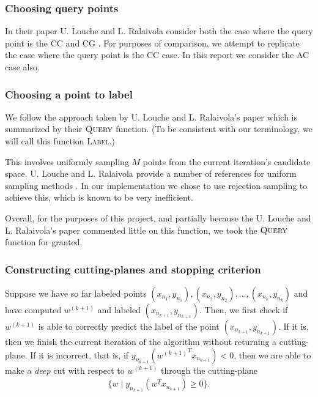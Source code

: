 \documentclass[11pt]{amsart}
\theoremstyle{definition}
\theoremstyle{remark}
\newcommand{\transpose}{T}
\begin{document}
            \subsubsection*{Choosing query points} In their paper U. Louche and L. Ralaivola consider both the case where the query point is the CC and  CG \cite[Section III.D]{LR15}. For purposes of comparison, we attempt to replicate the case where the query point is the CC case. In this report we consider the AC case also.

            \subsubsection*{Choosing a point to label }We follow the approach taken by U. Louche and L. Ralaivola's paper \cite[Section III.D]{LR15} which is summarized by their $\textsc{Query}$ function. (To be consistent with our terminology, we will call this function \textsc{Label}.)

            This involves uniformly sampling $M$ points from the current iteration's candidate space. U. Louche and L. Ralaivola provide a number of references for uniform sampling methods \cite[Section III.D]{LR15}. In our implementation we chose to use rejection sampling to achieve this, which is known to be very inefficient. 
        
            Overall, for the purposes of this project, and partially because the U. Louche and L. Ralaivola's paper \cite[Section III.D]{LR15} commented little on this function, we took the $\textsc{Query}$ function for granted. 

            \subsubsection*{Constructing cutting-planes and stopping criterion} Suppose we have so far labeled points $(x_{n_1}, y_{n_1}), (x_{n_2}, y_{n_2}), \dots, (x_{n_{k}}, y_{n_{k}})$ and have computed $w^{(k+1)}$ and labeled $(x_{n_{k+1}}, y_{n_{k+1}})$. Then, we first check if $w^{(k+1)}$ is able to correctly predict the label of the point $(x_{n_{k+1}}, y_{n_{k+1}})$. If it is, then we finish the current iteration of the algorithm without returning a cutting-plane. If it is incorrect, that is, if $y_{n_{k+1}} ({w^{(k+1)}}^\transpose x_{n_{k+1}}) < 0$, then we are able to make a \emph{deep} cut with respect to $w^{(k+1)}$ through the cutting-plane
            \begin{align*}
                \{w \;|\; y_{n_{k+1}} (w^\transpose x_{n_{k+1}}) \geq 0\}.
            \end{align*}
\end{document}
